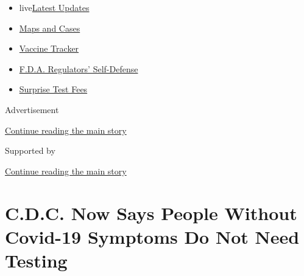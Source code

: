 \begin{itemize}
\tightlist
\item
  live\href{https://www.nytimes3xbfgragh.onion/2020/09/11/world/covid-19-coronavirus.html?name=styln-coronavirus-national\&region=TOP_BANNER\&block=storyline_menu_recirc\&action=click\&pgtype=Article\&impression_id=794551c1-f4b7-11ea-afc5-9fc35eb33fa0\&variant=undefined}{Latest
  Updates}
\item
  \href{https://www.nytimes3xbfgragh.onion/interactive/2020/us/coronavirus-us-cases.html?name=styln-coronavirus-national\&region=TOP_BANNER\&block=storyline_menu_recirc\&action=click\&pgtype=Article\&impression_id=794551c2-f4b7-11ea-afc5-9fc35eb33fa0\&variant=undefined}{Maps
  and Cases}
\item
  \href{https://www.nytimes3xbfgragh.onion/interactive/2020/science/coronavirus-vaccine-tracker.html?name=styln-coronavirus-national\&region=TOP_BANNER\&block=storyline_menu_recirc\&action=click\&pgtype=Article\&impression_id=794551c3-f4b7-11ea-afc5-9fc35eb33fa0\&variant=undefined}{Vaccine
  Tracker}
\item
  \href{https://www.nytimes3xbfgragh.onion/2020/09/10/us/politics/fda-coronavirus-vaccine.html?name=styln-coronavirus-national\&region=TOP_BANNER\&block=storyline_menu_recirc\&action=click\&pgtype=Article\&impression_id=794551c4-f4b7-11ea-afc5-9fc35eb33fa0\&variant=undefined}{F.D.A.
  Regulators' Self-Defense}
\item
  \href{https://www.nytimes3xbfgragh.onion/2020/09/09/upshot/coronavirus-surprise-test-fees.html?name=styln-coronavirus-national\&region=TOP_BANNER\&block=storyline_menu_recirc\&action=click\&pgtype=Article\&impression_id=794551c5-f4b7-11ea-afc5-9fc35eb33fa0\&variant=undefined}{Surprise
  Test Fees}
\end{itemize}

Advertisement

\protect\hyperlink{after-top}{Continue reading the main story}

Supported by

\protect\hyperlink{after-sponsor}{Continue reading the main story}

\hypertarget{cdc-now-says-people-without-covid-19-symptoms-do-not-need-testing}{%
\section{C.D.C. Now Says People Without Covid-19 Symptoms Do Not Need
Testing}\label{cdc-now-says-people-without-covid-19-symptoms-do-not-need-testing}}

